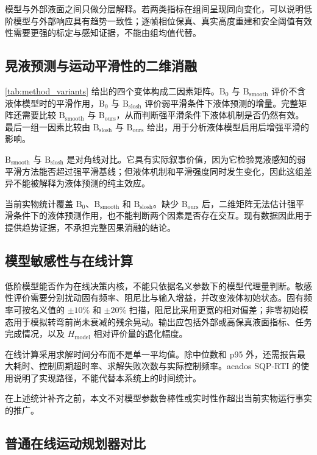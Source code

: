 模型与外部液面之间只做分层解释。若两类指标在组间呈现同向变化，可以说明低阶模型与外部响应具有趋势一致性；逐帧相位保真、真实高度重建和安全阈值有效性需要更强的标定与感知证据，不能由组均值代替。

\subsection{晃液预测与运动平滑性的二维消融}

\cref{tab:method_variants} 给出的四个变体构成二因素矩阵。$\mathrm{B}_{0}$ 与 $\mathrm{B}_{\mathrm{smooth}}$ 评价不含液体模型时的平滑作用，$\mathrm{B}_{0}$ 与 $\mathrm{B}_{\mathrm{slosh}}$ 评价弱平滑条件下液体预测的增量。完整矩阵还需要比较 $\mathrm{B}_{\mathrm{smooth}}$ 与 $\mathrm{B}_{\mathrm{ours}}$，从而判断强平滑条件下液体机制是否仍然有效。最后一组一因素比较由 $\mathrm{B}_{\mathrm{slosh}}$ 与 $\mathrm{B}_{\mathrm{ours}}$ 给出，用于分析液体模型启用后增强平滑的影响。

$\mathrm{B}_{\mathrm{smooth}}$ 与 $\mathrm{B}_{\mathrm{slosh}}$ 是对角线对比。它具有实际叙事价值，因为它检验晃液感知的弱平滑方法能否超过强平滑基线；但液体机制和平滑强度同时发生变化，因此这组差异不能被解释为液体预测的纯主效应。

当前实物统计覆盖 $\mathrm{B}_{0}$、$\mathrm{B}_{\mathrm{smooth}}$ 和 $\mathrm{B}_{\mathrm{slosh}}$。缺少 $\mathrm{B}_{\mathrm{ours}}$ 后，二维矩阵无法估计强平滑条件下的液体预测作用，也不能判断两个因素是否存在交互。现有数据因此用于提供趋势证据，不承担完整因果消融的结论。

\subsection{模型敏感性与在线计算}

低阶模型能否作为在线决策内核，不能只依据名义参数下的模型代理量判断。敏感性评价需要分别扰动固有频率、阻尼比与输入增益，并改变液体初始状态。固有频率可按名义值的 $\pm10\%$ 和 $\pm20\%$ 扫描，阻尼比采用更宽的相对偏差；非零初始模态用于模拟转弯前尚未衰减的残余晃动。输出应包括外部或高保真液面指标、任务完成情况，以及 $H_{\mathrm{model}}$ 相对评价量的退化幅度。

在线计算采用求解时间分布而不是单一平均值。除中位数和 p95 外，还需报告最大耗时、控制周期超时率、求解失败次数与实际控制频率。acados SQP-RTI 的使用说明了实现路径，不能代替本系统上的时间统计。

在上述统计补齐之前，本文不对模型参数鲁棒性或实时性作超出当前实物运行事实的推广。

\subsection{普通在线运动规划器对比}

